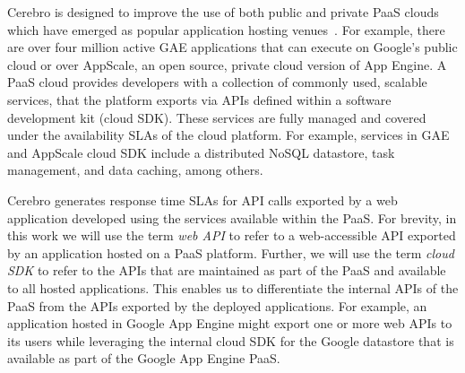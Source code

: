 
Cerebro is designed to improve the use of both public and private PaaS clouds 
which have emerged as popular application
hosting venues~\cite{paas-growth}.
For example, there are over four million active GAE
applications that 
can execute on Google's public cloud or over AppScale, an open source, private 
cloud version of App Engine.
A PaaS cloud provides developers 
with a collection of commonly used, scalable services,
that the platform exports via APIs defined within a software 
development kit (cloud SDK). These services are fully managed and covered under 
the availability SLAs of the cloud platform. For example, services 
in GAE and AppScale cloud SDK
include a distributed NoSQL datastore, task management, 
and data caching, among others. 

Cerebro generates response time SLAs for API calls exported by a web
application
developed using the services available within the PaaS.  For brevity, in this work
we will use the
term \textit{web API} to refer to a web-accessible API exported by an
application hosted on a PaaS platform. Further, 
we will use the term \textit{cloud
SDK} to refer to the APIs that are maintained as part of the PaaS and
available to all hosted applications. This enables us to
differentiate the internal APIs of the PaaS from the 
APIs exported by the deployed applications.   
For example, an application hosted in Google App Engine might export one or
more web APIs to its users while leveraging the internal cloud SDK for the
Google datastore that is available as part of the Google App Engine PaaS.

